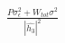 \documentclass[preview]{standalone}
\begin{document}
\begin{align*}
\frac{P \sigma_\epsilon^2 + W_{tot} \sigma^2 }{ \left| \hat{h_3} \right| ^2 }
\end{align*}
\end{document}
